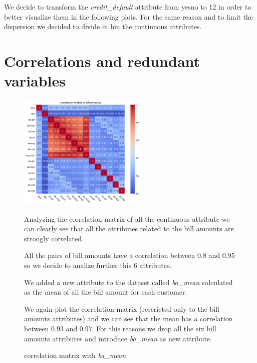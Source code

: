 We decide to transform the \textit{credit\_default} attribute from yes\/no to 1\/2 in order to better visualize them in the following plots. For the same reason and to limit the dispersion we decided to divide in bin the continuous attributes. %


\section{Correlations and redundant variables}

\begin{figure}[h]
  \begin{minipage}[h]{.95\textwidth}
  
    \begin{floatingfigure}[r]{0.55\textwidth}
        \mbox{\includegraphics[width=0.55\textwidth]{img/ch2/correlation_matrix_ba}}
        \caption{correlation matrix with \textit{ba\_mean}}
    \end{floatingfigure}

  Analyzing the correlation matrix of all the continuous attribute we can clearly see that all the attributes related to the bill amounts are strongly correlated.

  All the pairs of bill amounts have a correlation between $0.8$ and $0.95$ so we decide to analize further this $6$ attributes.
    
  
  We added a new attribute to the dataset called \textit{ba\_mean} calculated as the mean of all the bill amount for each customer.
  
    
  We again plot the correlation matrix (rescricted only to the bill amounts attributes) and we can see that the mean has a correlation between $0.93$ and $0.97$. For this reasons we drop all the six bill amounts attributes and introduce \textit{ba\_mean} as new attribute. 


    
  \end{minipage}
\end{figure}
